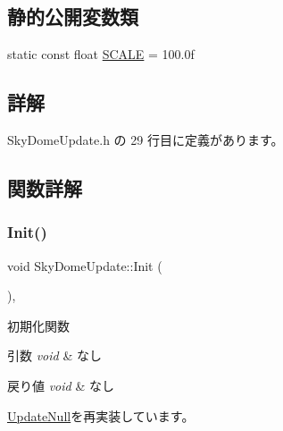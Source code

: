 \subsection*{静的公開変数類}
\begin{DoxyCompactItemize}
\item 
static const float \mbox{\hyperlink{class_sky_dome_update_a4c6750a54880db753cfe2a4ecfd24130}{S\+C\+A\+LE}} = 100.\+0f
\end{DoxyCompactItemize}


\subsection{詳解}


 Sky\+Dome\+Update.\+h の 29 行目に定義があります。



\subsection{関数詳解}
\mbox{\label{class_sky_dome_update_ab4fec6d13590c07e39e6e8b4f7f7613a}} 
\subsubsection{\texorpdfstring{Init()}{Init()}}
{\footnotesize\ttfamily void Sky\+Dome\+Update\+::\+Init (\begin{DoxyParamCaption}{ }\end{DoxyParamCaption})\hspace{0.3cm}{\ttfamily [override]}, {\ttfamily [virtual]}}



初期化関数 


\begin{DoxyParams}{引数}
{\em void} & なし \\
\hline
\end{DoxyParams}

\begin{DoxyRetVals}{戻り値}
{\em void} & なし \\
\hline
\end{DoxyRetVals}


\mbox{\hyperlink{class_update_null_aaa8f5fe1f03e252ad75eb8c888a5bf46}{Update\+Null}}を再実装しています。



